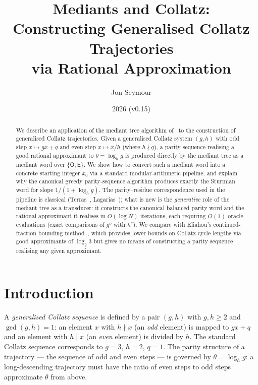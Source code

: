 \documentclass[12pt]{article}
\title{Mediants and Collatz:\\
  Constructing Generalised Collatz Trajectories\\
  via Rational Approximation}
\author{Jon Seymour}
\date{2026 (v0.15)}
\theoremstyle{definition}
\theoremstyle{remark}
\theoremstyle{plain}
\newcommand{\OO}{\mathsf{O}}
\newcommand{\EE}{\mathsf{E}}
\begin{document}
\maketitle

\begin{abstract}
We describe an application of the mediant tree algorithm of~\cite{paper76} to the
construction of generalised Collatz trajectories.
Given a generalised Collatz system $(g, h)$ with odd step $x \mapsto gx + q$ and
even step $x \mapsto x/h$ (where $h \nmid q$), a parity sequence realising a good rational approximant
to $\theta = \log_h g$ is produced directly by the mediant tree as a mediant word
over $\{\OO, \EE\}$.
We show how to convert such a mediant word into a concrete starting integer $x_0$
via a standard modular-arithmetic pipeline, and explain why the canonical greedy
parity-sequence algorithm produces exactly the Sturmian word for slope
$1/(1+\log_h g)$.
The parity--residue correspondence used in the pipeline is classical (Terras~\cite{terras1976},
Lagarias~\cite{lagarias1985}); what is new is the \emph{generative} role of the mediant
tree as a transducer: it constructs the canonical balanced parity word and the rational
approximant it realises in $O(\log N)$ iterations, each requiring $O(1)$ oracle
evaluations (exact comparisons of $g^o$ with $h^e$).
We compare with Eliahou's continued-fraction bounding method~\cite{eliahou1993}, which
provides lower bounds on Collatz cycle lengths via good approximants of $\log_2 3$ but
gives no means of constructing a parity sequence realising any given approximant.
\end{abstract}

\tableofcontents

\section{Introduction}
\label{sec:intro}

A \emph{generalised Collatz sequence} is defined by a pair $(g, h)$ with $g, h \geq 2$
and $\gcd(g, h) = 1$: an element $x$ with $h \nmid x$ (an \emph{odd} element) is mapped
to $gx + q$ and an element with $h \mid x$ (an \emph{even} element) is divided by $h$.
The standard Collatz sequence corresponds to $g = 3$, $h = 2$, $q = 1$.
The parity structure of a trajectory --- the sequence of odd and even steps --- is
governed by $\theta = \log_h g$: a long-descending trajectory must have the ratio
of even steps to odd steps approximate $\theta$ from above.
\end{document}
